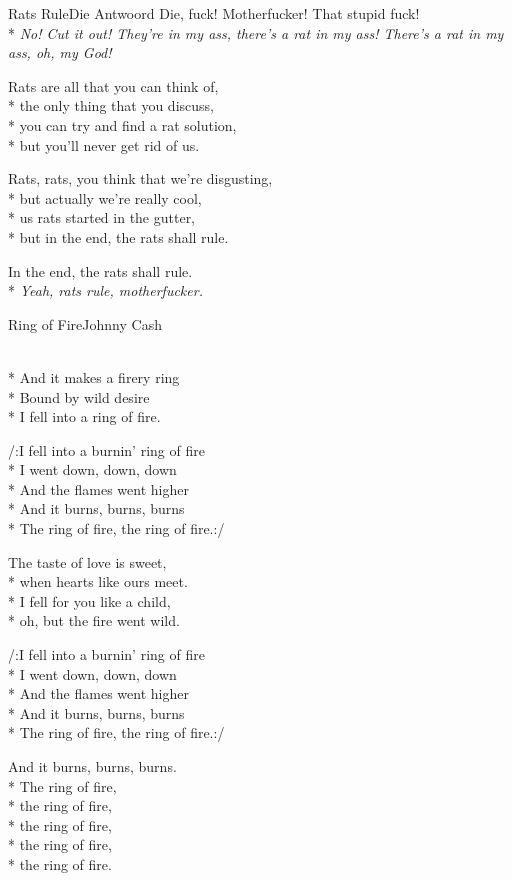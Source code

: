 \documentclass[10.5pt]{book}
\begin{document}
\begin{poem}{Rats Rule}{Die Antwoord}
Die, fuck! Motherfucker! That stupid fuck!\\*
\textit{No! Cut it out! They're in my ass, there’s a rat in my ass! There’s a rat in my ass, oh, my God!}

Rats are all that you can think of,\\*
the only thing that you discuss,\\*
you can try and find a rat solution,\\*
but you'll never get rid of us.

Rats, rats, you think that we're disgusting,\\*
but actually we're really cool,\\*
us rats started in the gutter,\\*
but in the end, the rats shall rule.

In the end, the rats shall rule.\\*
\textit{Yeah, rats rule, motherfucker.}

\end{poem}
\fi
\begin{poem}{Ring of Fire}{Johnny Cash}

\settowidth{\versewidth}{I fell into a burnin' ring of fire}

\\*
And it makes a firery ring\\*
Bound by wild desire\\*
I fell into a ring of fire.

/:I fell into a burnin' ring of fire\\*
I went down, down, down\\*
And the flames went higher\\*
And it burns, burns, burns\\*
The ring of fire, the ring of fire.:/

The taste of love is sweet,\\*
when hearts like ours meet.\\*
I fell for you like a child,\\*
oh, but the fire went wild.

/:I fell into a burnin' ring of fire\\*
I went down, down, down\\*
And the flames went higher\\*
And it burns, burns, burns\\*
The ring of fire, the ring of fire.:/

And it burns, burns, burns.\\*
The ring of fire,\\*
the ring of fire,\\*
the ring of fire,\\*
the ring of fire,\\*
the ring of fire.

\end{poem}
\end{document}
